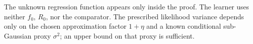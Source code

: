 The unknown regression function appears only inside the proof. The learner uses neither $f_0$, $R_0$, nor the comparator. The prescribed likelihood variance depends only on the chosen approximation factor $1+\eta$ and a known conditional sub-Gaussian proxy $\sigma^2$; an upper bound on that proxy is sufficient.
